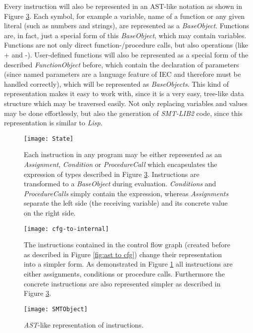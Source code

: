 Every instruction will also be represented in an AST-like notation as shown in Figure \ref{fig:smtobject}. Each symbol, for example a variable, name of a function or any given literal (such as numbers and strings), are represented as a \emph{BaseObject}. Functions are, in fact, just a special form of this \emph{BaseObject}, which may contain variables. Functions are not only direct function-/procedure calls, but also operations (like + and -). User-defined functions will also be represented as a special form of the described \emph{FunctionObject} before, which contain the declaration of parameters (since named parameters are a language feature of IEC and therefore must be handled correctly), which will be represented as \emph{BaseObjects}. 
This kind of representation makes it easy to work with, since it is a very easy, tree-like data structure which may be traversed easily. Not only replacing variables and values may be done effortlessly, but also the generation of \emph{SMT-LIB2} code, since this representation is similar to \emph{Lisp}.
\begin{figure}[h!]
	\centering
	\texttt{[image: State]}
	\caption{Each instruction in any program may be either represented as an \emph{Assignment}, \emph{Condition} or \emph{ProcedureCall} which encapsulates the expression of types described in Figure \ref{fig:smtobject}. Instructions are transformed to a \emph{BaseObject} during evaluation. \emph{Conditions} and \emph{ProcedureCalls} simply contain the expression, whereas \emph{Assignments} separate the left side (the receiving variable) and its concrete value on the right side.}
	\label{fig:state}
\end{figure}
\begin{figure}[hbt!]
	\centering
	\texttt{[image: cfg-to-internal]}
	\caption{The instructions contained in the control flow graph (created before as described in Figure \ref{fig:ast to cfg}) change their representation into a simpler form. As demonstrated in Figure \ref{fig:state} all instructions are either assignments, conditions or procedure calls. Furthermore the concrete instructions are also represented simpler as described in Figure \ref{fig:smtobject}. }
	\label{fig:cfg to internal}
\end{figure}

\begin{figure}[h!]
	\centering
	\texttt{[image: SMTObject]}
	\caption{\emph{AST}-like representation of instructions. }
	\label{fig:smtobject}
\end{figure}
